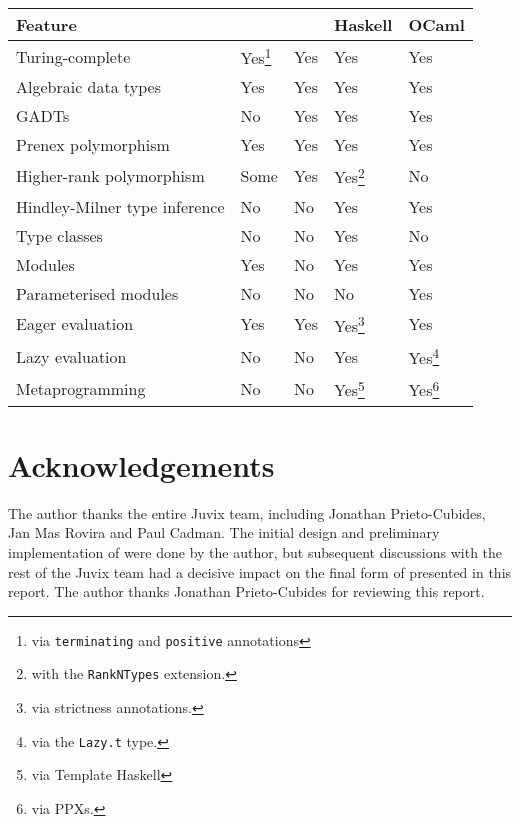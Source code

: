 \documentclass[
    9pt,            %
    techreport,        %
    affiltop,       %
]{art}
\begin{document}
\begin{center}
\label{tab:comparison}
\begin{tabular}{lllll}
\toprule
\textbf{Feature} & \textbf{\Juvix{}} & \textbf{\JuvixCore{}} &
\textbf{Haskell} & \textbf{OCaml} \\ \toprule
Turing-complete  &  Yes\footnote{via \texttt{terminating} and \texttt{positive} annotations}   &  Yes   &  Yes  & Yes \\
Algebraic data types  &  Yes   &  Yes   &  Yes  & Yes \\
GADTs  &  No   &  Yes   &  Yes &  Yes  \\
Prenex polymorphism  &  Yes   &  Yes &  Yes  &  Yes \\
Higher-rank polymorphism  &  Some   &  Yes   &  Yes\footnote{with the
\texttt{RankNTypes} extension.}  &   No  \\
Hindley-Milner type inference & No & No & Yes & Yes \\
Type classes  &  No   &  No   &  Yes &   No \\
Modules  &  Yes   &  No   &  Yes &   Yes \\
Parameterised modules  &  No   &  No   &  No &   Yes \\
Eager evaluation  &  Yes   &  Yes   &  Yes\footnote{via strictness
annotations.} &   Yes \\
Lazy evaluation  &  No  &  No &  Yes &   Yes\footnote{via the
\texttt{Lazy.t} type.} \\
Metaprogramming  &  No   &  No   &  Yes\footnote{via Template Haskell} &
Yes\footnote{via PPXs.} \\
\bottomrule
\end{tabular}
\end{center}

\section*{Acknowledgements}

The author thanks the entire Juvix team, including Jonathan Prieto-Cubides,
Jan Mas Rovira and Paul Cadman. The initial design and preliminary
implementation of \JuvixCore{} were done by the author, but subsequent
discussions with the rest of the Juvix team had a decisive impact on the
final form of \JuvixCore{} presented in this report. The author thanks Jonathan Prieto-Cubides for reviewing this report.

\nocite{*}

\end{document}
